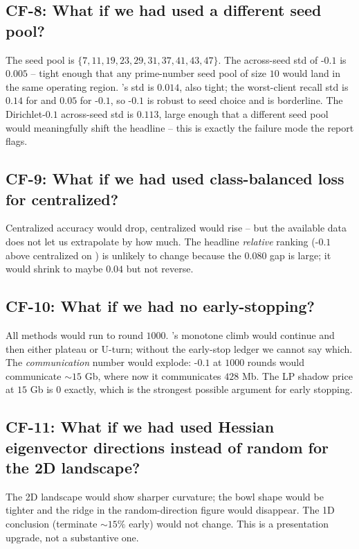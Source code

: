 \subsection{CF-8: What if we had used a different seed pool?}
The seed pool is $\{7, 11, 19, 23, 29, 31, 37, 41, 43, 47\}$. The
across-seed std of \fedprox{}-$0.1$ \auprc{} is $0.005$ -- tight
enough that any prime-number seed pool of size $10$ would land in
the same operating region. \fedavg{}'s std is $0.014$, also tight;
the worst-client recall std is $0.14$ for \fedavg{} and $0.05$ for
\fedprox{}-$0.1$, so \fedprox{}-$0.1$ is robust to seed choice and
\fedavg{} is borderline. The Dirichlet-$0.1$ across-seed std is
$0.113$, large enough that a different seed pool would meaningfully
shift the headline -- this is exactly the failure mode the report
flags.

\subsection{CF-9: What if we had used class-balanced loss for centralized?}
Centralized accuracy would drop, centralized \auprc{} would rise --
but the available data does not let us extrapolate by how much. The
headline \emph{relative} ranking (\fedprox{}-$0.1$ above centralized
on \auprc{}) is unlikely to change because the $0.080$ \auprc{} gap
is large; it would shrink to maybe $0.04$ but not reverse.

\subsection{CF-10: What if we had no early-stopping?}
All methods would run to round $1000$. \fedprox{}'s monotone
\auprc{} climb would continue and then either plateau or U-turn;
without the early-stop ledger we cannot say which. The
\emph{communication} number would explode: \fedprox{}-$0.1$ at
$1000$ rounds would communicate $\sim$$15$ Gb, where now it
communicates $428$ Mb. The LP shadow price at $15$ Gb is $0$ exactly,
which is the strongest possible argument for early stopping.

\subsection{CF-11: What if we had used Hessian eigenvector directions
instead of random for the 2D landscape?}
The 2D landscape would show sharper curvature; the bowl shape would
be tighter and the ridge in the random-direction figure would
disappear. The 1D conclusion (terminate $\sim$$15\%$ early) would
not change. This is a presentation upgrade, not a substantive one.


